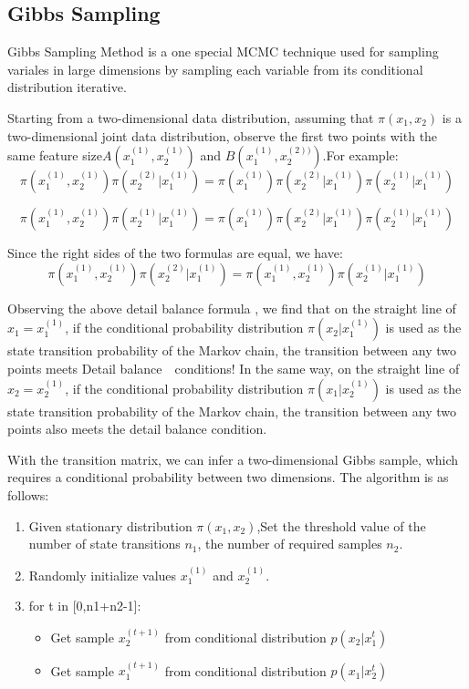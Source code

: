 \subsection{Gibbs Sampling}
Gibbs Sampling Method \cite{bda} is a one special MCMC technique used for sampling variales in large dimensions by sampling each variable from its conditional distribution iterative.

Starting from a two-dimensional data distribution, assuming that $\pi(x_1,x_2)$ is a two-dimensional joint data distribution, observe the first two points with the same feature size$A(x_1^{(1)},x_2^{(1)})$ and $B(x_1^{(1)},x_2^{(2))})$.For example:
\[
  \pi(x_1^{(1)},x_2^{(1)})\pi(x_2^{(2)}|x_1^{(1)}) = \pi(x_1^{(1)})\pi(x_2^{(2)}|x_1^{(1)})\pi(x_2^{(1)}|x_1^{(1)})
\]

\[
  \pi(x_1^{(1)},x_2^{(1)})\pi(x_2^{(1)}|x_1^{(1)}) = \pi(x_1^{(1)})\pi(x_2^{(2)}|x_1^{(1)})\pi(x_2^{(1)}|x_1^{(1)})
\]

Since the right sides of the two formulas are equal, we have:
\[
  \pi(x_1^{(1)},x_2^{(1)})\pi(x_2^{(2)}|x_1^{(1)}) =   \pi(x_1^{(1)},x_2^{(1)})\pi(x_2^{(1)}|x_1^{(1)})
\]

Observing the above detail balance formula , we find that on the straight line of $x_1 = x_1^{(1)}$, if the conditional probability distribution $\pi(x_2|x_1^{(1)})$ is used as the state transition probability of the Markov chain, the transition between any two points meets Detail balance　conditions! In the same way, on the straight line of $x_2 = x_2^{(1)}$, if the conditional probability distribution $\pi(x_1|x_2^{(1)})$  is used as the state transition probability of the Markov chain, the transition between any two points also meets the detail balance condition.


With the  transition matrix, we can infer a two-dimensional Gibbs sample, which requires a conditional probability between two dimensions. The algorithm is as follows:
\begin{enumerate}
  \item Given stationary distribution $\pi(x_1,x_2)$,Set the threshold value of the number of state transitions $n_1$, the number of required samples $n_2$.
  \item Randomly initialize values $x_1^{(1)}$ and $x_2^{(1)}$.
  \item for t in [0,n1+n2-1]:
      \begin{itemize}
        \item Get sample $x_2^{(t+1)}$ from conditional distribution $p(x_2|x_1^t)$
        \item Get sample $x_1^{(t+1)}$ from conditional distribution $p(x_1|x_2^t)$
      \end{itemize}
\end{enumerate}
